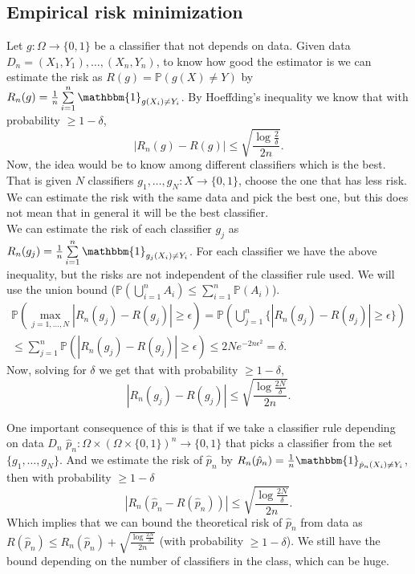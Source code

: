 \documentclass[11pt, english]{article}
\begin{document}
\subsection{Empirical risk minimization}

Let $g:\Omega\rightarrow\{0,1\}$ be a classifier that not depends on data. Given data $D_n=(X_1,Y_1),\dots,(X_n,Y_n)$, to know how good the estimator is we can estimate the risk as $R(g)=\mathbb{P}(g(X)\neq Y)$ by $R_n(g)=\frac{1}{n}\sum\limits_{i=1}^n\mathbbm{1}_{g(X_i)\neq Y_i}$. By Hoeffding's inequality we know that with probability $\geq 1-\delta$, 
\begin{equation}
	|R_n(g)-R(g)|\leq\sqrt{\frac{\log\frac{2}{\delta}}{2n}}.
\end{equation}
Now, the idea would be to know among different classifiers which is the best. That is given $N$ classifiers $g_1,\dots,g_N: X\rightarrow\{0,1\}$, choose the one that has less risk. We can estimate the risk with the same data and pick the best one, but this does not mean that in general it will be the best classifier.\\

We can estimate the risk of each classifier $g_j$ as $R_n(g_j)=\frac{1}{n}\sum\limits_{i=1}^n \mathbbm{1}_{g_j(X_i)\neq Y_i}$. For each classifier we have the above inequality, but the risks are not independent of the classifier rule used. We will use the union bound ($\mathbb{P}(\bigcup\limits_{i=1}^n A_i)\leq\sum\limits_{i=1}^n\mathbb{P}(A_i)$).
\begin{align}
	\mathbb{P}(\underset{j=1,\dots,N}{\max}|R_n(g_j)-R(g_j)|\geq\epsilon)=\mathbb{P}(\bigcup\limits_{j=1}^n\{|R_n(g_j)-R(g_j)|\geq \epsilon\})\\
	\leq\sum\limits_{j=1}^n\mathbb{P}(|R_n(g_j)-R(g_j)|\geq\epsilon)\leq 2Ne^{-2n\epsilon^2}=\delta.
\end{align}
Now, solving for $\delta$ we get that with probability $\geq 1-\delta$, \begin{equation}
	|R_n(g_j)-R(g_j)|\leq\sqrt{\frac{\log\frac{2 N}{\delta}}{2n}}.
\end{equation}

One important consequence of this is that if we take a classifier rule depending on data $D_n$ $\hat{p}_n:\Omega\times(\Omega\times\{0,1\})^n\rightarrow \{0,1\}$ that picks a classifier from the set $\{g_1,\dots,g_N\}$. And we estimate the risk of $\hat{p}_n$ by $R_n(\hat{p}_n)= \frac{1}{n}\mathbbm{1}_{\hat{p}_n(X_i)\neq Y_i}$, then with probability $\geq 1-\delta$
\begin{equation}
	|R_n(\hat{p}_n-R(\hat{p}_n))|\leq \sqrt{\frac{\log\frac{2N}{\delta}}{2n}}.
	\label{riskbound}
\end{equation}
Which implies that we can bound the theoretical risk of $\hat{p}_n$ from data as $R(\hat{p}_n)\leq R_n(\hat{p}_n)+ \sqrt{\frac{\log\frac{2N}{\delta}}{2n}}$ (with probability $\geq 1-\delta$). We still have the bound depending on the number of classifiers in the class, which can be huge.\\
\end{document}

